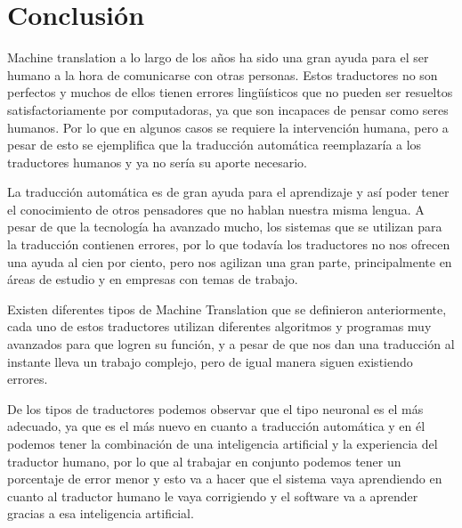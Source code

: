 \documentclass[conference]{IEEEtran}
\begin{document}
\section{Conclusión}
Machine translation a lo largo de los años ha sido una gran ayuda para el ser humano a la hora de comunicarse con otras personas. Estos traductores no son perfectos y muchos de ellos tienen errores lingüísticos que no pueden ser resueltos satisfactoriamente por computadoras, ya que son incapaces de pensar como seres humanos. Por lo que en algunos casos se requiere la intervención humana, pero a pesar de esto se ejemplifica que la traducción automática reemplazaría a los traductores humanos y ya no sería su aporte necesario.

La traducción automática es de gran ayuda para el aprendizaje y así poder tener el conocimiento de otros pensadores que no hablan nuestra misma lengua. A pesar de que la tecnología ha avanzado mucho, los sistemas que se utilizan para la traducción contienen errores, por lo que todavía los traductores no nos ofrecen una ayuda al cien por ciento, pero nos agilizan una gran parte, principalmente en áreas de estudio y en empresas con temas de trabajo.

Existen diferentes tipos de Machine Translation que se definieron anteriormente, cada uno de estos traductores utilizan diferentes algoritmos y programas muy avanzados para que logren su función, y a pesar de que nos dan una traducción al instante lleva un trabajo complejo, pero de igual manera siguen existiendo errores.

De los tipos de traductores podemos observar que el tipo neuronal es el más adecuado, ya que es el más nuevo en cuanto a traducción automática y en él podemos tener la combinación de una inteligencia artificial y la experiencia del traductor humano, por lo que al trabajar en conjunto podemos tener un porcentaje de error menor y esto va a hacer que el sistema vaya aprendiendo en cuanto al traductor humano le vaya corrigiendo y el software va a aprender gracias a esa inteligencia artificial.
\end{document}
